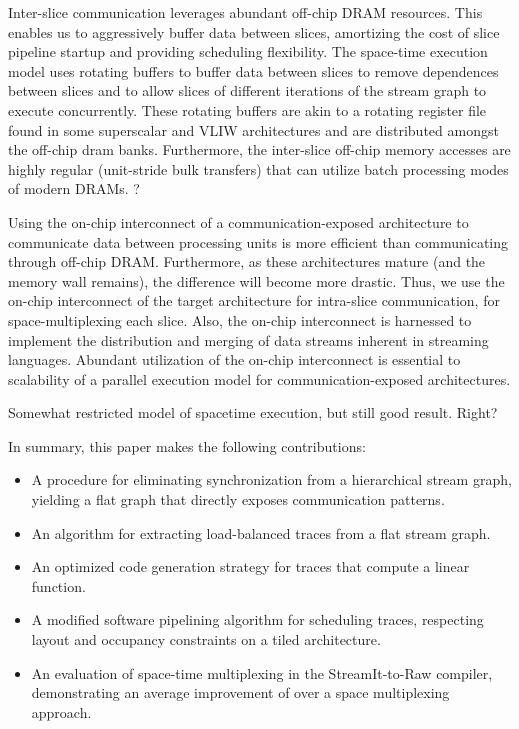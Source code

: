 Inter-slice communication leverages abundant off-chip DRAM resources.
This enables us to aggressively buffer data between slices, amortizing
the cost of slice pipeline startup and providing scheduling
flexibility. The space-time execution model uses rotating buffers to
buffer data between slices to remove dependences between slices and to
allow slices of different iterations of the stream graph to execute
concurrently.  These rotating buffers are akin to a rotating register
file found in some superscalar and VLIW architectures and are
distributed amongst the off-chip dram banks. Furthermore, the
inter-slice off-chip memory accesses are highly regular (unit-stride
bulk transfers) that can utilize batch processing modes of modern
DRAMs. ?

Using the on-chip interconnect of a communication-exposed architecture
to communicate data between processing units is more efficient than
communicating through off-chip DRAM. Furthermore, as these
architectures mature (and the memory wall remains), the difference
will become more drastic.  Thus, we use the on-chip interconnect of
the target architecture for intra-slice communication, for
space-multiplexing each slice.  Also, the on-chip interconnect is
harnessed to implement the distribution and merging of data streams
inherent in streaming languages. Abundant utilization of the on-chip
interconnect is essential to scalability of a parallel execution
model for communication-exposed architectures.


Somewhat restricted model of spacetime execution, but still good
result.  Right?

In summary, this paper makes the following contributions:

\begin{itemize}
\item A procedure for eliminating synchronization from a hierarchical
stream graph, yielding a flat graph that directly exposes
communication patterns.
\item An algorithm for extracting load-balanced traces from a flat
stream graph.
\item An optimized code generation strategy for traces that compute a
linear function.
\item A modified software pipelining algorithm for scheduling traces,
respecting layout and occupancy constraints on a tiled architecture.
\item An evaluation of space-time multiplexing in the StreamIt-to-Raw
compiler, demonstrating an average improvement of  over a
space multiplexing approach.
\end{itemize}

